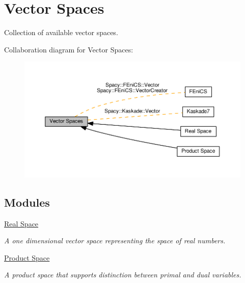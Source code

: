 \hypertarget{group__VectorSpaceGroup}{}\section{Vector Spaces}
\label{group__VectorSpaceGroup}


Collection of available vector spaces.  


Collaboration diagram for Vector Spaces\+:
\nopagebreak
\begin{figure}[H]
\begin{center}
\leavevmode
\includegraphics[width=350pt]{group__VectorSpaceGroup}
\end{center}
\end{figure}
\subsection*{Modules}
\begin{DoxyCompactItemize}
\item 
\hyperlink{group__RealGroup}{Real Space}
\begin{DoxyCompactList}\small\item\em A one dimensional vector space representing the space of real numbers. \end{DoxyCompactList}\item 
\hyperlink{group__ProductSpaceGroup}{Product Space}
\begin{DoxyCompactList}\small\item\em A product space that supports distinction between primal and dual variables. \end{DoxyCompactList}\end{DoxyCompactItemize}
